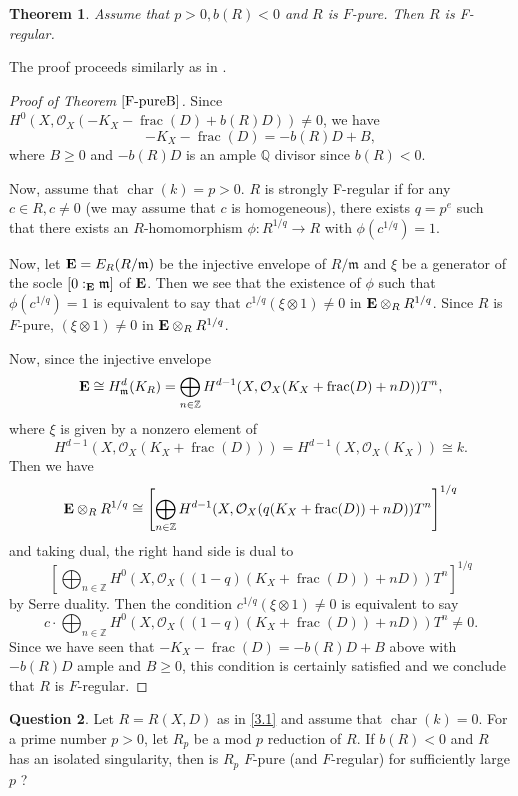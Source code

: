 \documentclass[12pt]{amsart}
\newtheorem{thm}{Theorem}[section]
\theoremstyle{definition}
\newtheorem{quest}[thm]{Question}
\theoremstyle{remark}
\numberwithin{equation}{section}
\DeclareMathOperator{\chr}{char}
\DeclareMathOperator{\FRC}{frac}
\newcommand{\m}{\mathfrak m}
\newcommand{\Z}{\mathbb Z}
\newcommand{\Q}{\mathbb Q}
\newcommand{\cO}{\mathcal O}
\renewcommand{\:}{\colon}
\begin{document}
\begin{thm} \label{F-pureB}
Assume that $p>0, b(R)<0$ and $R$ is $F$-pure. Then $R$ is F-regular. 
\end{thm}

The proof proceeds similarly as in \cite{Wat91}.
 
\begin{proof}[Proof of Theorem $\ref{F-pureB}$]
Since $H^0(X, \cO_X(-K_X -\FRC(D) + b(R)D ))\ne 0$, we have 
\[ -K_X - \FRC(D) = - b(R) D + B, \] 
where $B\ge 0$ and $- b(R) D$ is an ample $\Q$ divisor since $b(R)<0$. 
\par
Now, assume that $\chr(k)=p>0$. $R$ is strongly F-regular if for any 
$c\in R, c\ne 0$ (we may assume that $c$ is homogeneous), there exists $q= p^e$ such that there exists an $R$-homomorphism 
$\phi : R^{1/q} \to R$ with $\phi(c^{1/q})=1$. \par
Now, let ${\bf E} = E_R(R/\m)$ be the injective envelope 
of $R/\m$ and $\xi$ be a generator 
of the socle $[0:_{\bf E} \m]$ of $\bf E$. 
Then we see that the existence of $\phi$ such that 
$\phi(c^{1/q})=1$ is equivalent to say that $c^{1/q}(\xi\otimes 1) \ne 0$ in 
${\bf E}\otimes_R R^{1/q}$. Since $R$ is $F$-pure,   $(\xi\otimes 1) \ne 0$ in 
${\bf E}\otimes_R R^{1/q}$.
\par  
Now, since the injective envelope 
\[
{\bf E} \cong H^d_{\m}(K_R) =\bigoplus_{n\in \Z} H^{d-1}(X, \cO_X( K_X+\FRC(D)+nD)) T^n,
\]
where $\xi$ is given by a nonzero element of 
\[
H^{d-1}(X, \cO_X( K_X+\FRC(D)))= 
H^{d-1}(X, \cO_X( K_X))\cong k.
\]  
Then we have 
\[{\bf E}\otimes_R R^{1/q} \cong \left[
\bigoplus_{n\in \Z} H^{d-1}(X, \cO_X( q(K_X+\FRC(D))+nD)) T^n\right]^{1/q}\]
and taking dual, the right hand side is dual to  
\[
\left[ \bigoplus_{n\in \Z} H^0(X, \cO_X((1-q)(K_X+\FRC(D))+nD)) T^n\right]^{1/q}
\]
by Serre duality. 
Then the condition $c^{1/q}(\xi\otimes 1) \ne 0$ is equivalent to say 
\[
c\cdot \bigoplus_{n\in \Z} H^0(X, \cO_X((1-q)(K_X+\FRC(D))+nD)) T^n 
\ne 0.
\] 
Since we have seen that $-K_X - \FRC(D) = - b(R) D + B$ above with 
$-b(R) D$ ample and 
$B\ge 0$, this condition is certainly satisfied and we conclude that 
$R$ is $F$-regular.  
\end{proof}


\begin{quest}\label{b(R)<0; ques} Let $R=R(X,D)$ as in \ref{3.1} and assume that $\chr(k)=0$. 
For a prime number $p>0$, let $R_p$ be a mod $p$ reduction of $R$. If $b(R)<0$ 
and $R$ has an isolated singularity,  then is $R_p$ 
$F$-pure (and $F$-regular) for sufficiently large $p$ ?
\end{quest}
\end{document}
